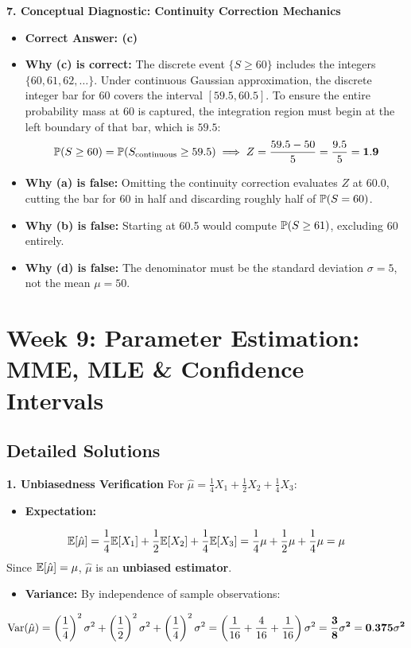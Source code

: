 \textbf{7. Conceptual Diagnostic: Continuity Correction Mechanics}
\begin{itemize}
    \item \textbf{Correct Answer: (c)}
    \item \textbf{Why (c) is correct:} The discrete event $\{S \ge 60\}$ includes the integers $\{60, 61, 62, \dots\}$. Under continuous Gaussian approximation, the discrete integer bar for 60 covers the interval $[59.5, 60.5]$. To ensure the entire probability mass at 60 is captured, the integration region must begin at the left boundary of that bar, which is $59.5$:
    $$\P(S \ge 60) = \P(S_{\text{continuous}} \ge 59.5) \implies Z = \frac{59.5 - 50}{5} = \frac{9.5}{5} = \mathbf{1.9}$$
    \item \textbf{Why (a) is false:} Omitting the continuity correction evaluates $Z$ at 60.0, cutting the bar for 60 in half and discarding roughly half of $\P(S = 60)$.
    \item \textbf{Why (b) is false:} Starting at 60.5 would compute $\P(S \ge 61)$, excluding 60 entirely.
    \item \textbf{Why (d) is false:} The denominator must be the standard deviation $\sigma = 5$, not the mean $\mu = 50$.
\end{itemize}

\section*{Week 9: Parameter Estimation: MME, MLE \& Confidence Intervals}

\subsection*{Detailed Solutions}

\textbf{1. Unbiasedness Verification}
For $\hat{\mu} = \frac{1}{4} X_1 + \frac{1}{2} X_2 + \frac{1}{4} X_3$:
\begin{itemize}
    \item \textbf{Expectation:}
\end{itemize}
$$\E[\hat{\mu}] = \frac{1}{4}\E[X_1] + \frac{1}{2}\E[X_2] + \frac{1}{4}\E[X_3] = \frac{1}{4}\mu + \frac{1}{2}\mu + \frac{1}{4}\mu = \mathbf{\mu}$$
Since $\E[\hat{\mu}] = \mu$, $\hat{\mu}$ is an \textbf{unbiased estimator}.
\begin{itemize}
    \item \textbf{Variance:} By independence of sample observations:
\end{itemize}
$$\Var(\hat{\mu}) = \left(\frac{1}{4}\right)^2 \sigma^2 + \left(\frac{1}{2}\right)^2 \sigma^2 + \left(\frac{1}{4}\right)^2 \sigma^2 = \left(\frac{1}{16} + \frac{4}{16} + \frac{1}{16}\right) \sigma^2 = \mathbf{\frac{3}{8} \sigma^2 = 0.375 \sigma^2}$$

